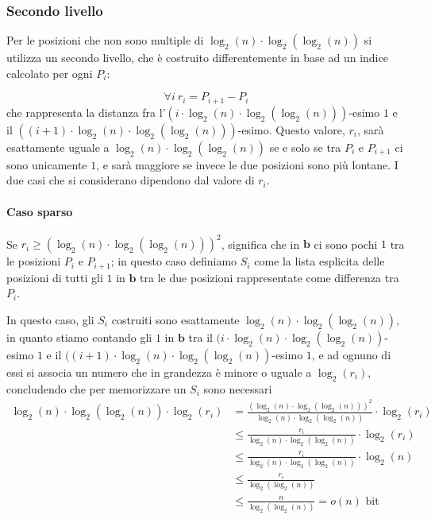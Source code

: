 \subsubsection{Secondo livello}
Per le posizioni che non sono multiple di $\log_2(n) \cdot \log_2(\log_2(n))$ si utilizza
un secondo livello, che è costruito differentemente in base ad un indice calcolato
per ogni $P_i$:

$$
	\forall i ~ r_i = P_{i + 1} - P_i
$$
che rappresenta la distanza fra l'$(i \cdot \log_2(n) \cdot \log_2(\log_2(n)))$-esimo $1$
e il $((i+1) \cdot \log_2(n) \cdot \log_2(\log_2(n)))$-esimo. Questo
valore, $r_i$, sarà esattamente uguale a $\log_2(n) \cdot \log_2(\log_2(n))$ se e solo se
tra $P_{i}$ e $P_{i+1}$ ci sono unicamente $1$, e sarà maggiore se invece le
due posizioni sono più lontane.
I due casi che si considerano dipendono dal valore di $r_i$.

\paragraph{Caso sparso}
Se $r_i \geq (\log_2(n) \cdot \log_2(\log_2(n)))^2$, significa che in $\mathbf{b}$ ci
sono pochi $1$ tra le posizioni $P_{i}$ e $P_{i+1}$; in questo caso
definiamo $S_i$ come la lista esplicita delle posizioni di tutti gli $1$
in $\mathbf{b}$ tra le due posizioni rappresentate come differenza tra $P_i$.

In questo caso, gli $S_i$ costruiti sono esattamente $\log_2(n)\cdot \log_2(\log_2(n))$,
in quanto stiamo contando gli $1$ in $\mathbf{b}$ tra il $(i \cdot \log_2(n) \cdot \log_2(\log_2(n))$-esimo
$1$ e il $((i+1) \cdot \log_2(n) \cdot \log_2(\log_2(n))$-esimo $1$, e ad ognuno
di essi si associa un numero che in grandezza è minore o uguale a
$\log_2(r_i)$, concludendo che per memorizzare un $S_i$ sono necessari
\begin{align*}
	\log_2(n)\cdot \log_2(\log_2(n)) \cdot \log_2(r_i) & = \frac{(\log_2(n)\cdot \log_2(\log_2(n)))^2}{\log_2(n)\cdot \log_2(\log_2(n))} \cdot \log_2(r_i) \\
	                                                   & \leq \frac{r_i}{\log_2(n)\cdot \log_2(\log_2(n))} \cdot \log_2(r_i)                               \\
	                                                   & \leq \frac{r_i}{\log_2(n)\cdot \log_2(\log_2(n))} \cdot \log_2(n)                                 \\
	                                                   & \leq \frac{r_i}{\log_2(\log_2(n))}                                                                \\
	                                                   & \leq \frac{n}{\log_2(\log_2(n))}   = o(n) \text{ bit}
\end{align*}

